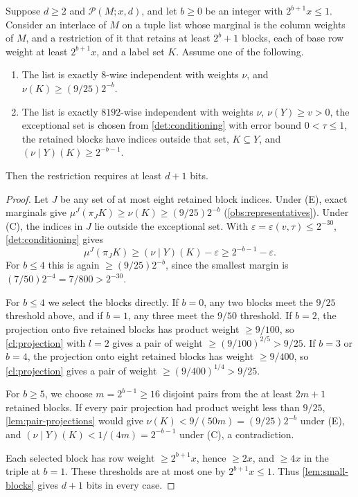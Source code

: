 \documentclass[11pt,letterpaper]{article} \usepackage[utf8]{inputenc}
\theoremstyle{plain} \newtheorem{theorem}{Theorem}[section]
\theoremstyle{definition} \newaliascnt{definition}{theorem}
\newcommand{\RP}[3]{\mathcal{P}(#1;#2,#3)}
\begin{document}
\begin{lemma}\label{det:suffix}
Suppose $d\ge2$ and $\RP{M}{x}{d}$, and let $b\ge0$ be an integer with
$2^{b+1}x\le1$. Consider an interlace of $M$ on a tuple list whose marginal is
the column weights of $M$, and a restriction of it that retains at least $2^b+1$ blocks, each
of base row weight at least $2^{b+1}x$, and a label set $K$. Assume one of the
following.
\begin{enumerate}
\item[(E)] The list is exactly $8$-wise independent with weights $\nu$, and
$\nu(K)\ge(9/25)2^{-b}$.
\item[(C)] The list is exactly $8192$-wise independent with weights $\nu$,
$\nu(Y)\ge v>0$, the exceptional set is chosen from \cref{det:conditioning}
with error bound $0<\tau\le1$, the retained blocks have indices outside that set,
$K\subseteq Y$, and $(\nu\mid Y)(K)\ge2^{-b-1}$.
\end{enumerate}
Then the restriction requires at least $d+1$ bits.
\end{lemma}
\begin{proof}
Let $J$ be any set of at most eight retained block indices. Under (E), exact
marginals give $\mu^J(\pi_JK)\ge\nu(K)\ge(9/25)2^{-b}$
(\cref{obs:representatives}). Under (C), the indices in $J$ lie outside the
exceptional set. With
$\varepsilon=\varepsilon(v,\tau)\le2^{-30}$, \cref{det:conditioning} gives
\[
\mu^J(\pi_JK)\ge(\nu\mid Y)(K)-\varepsilon
\ge2^{-b-1}-\varepsilon.
\]
For $b\le4$ this is again $\ge(9/25)2^{-b}$, since the smallest margin
is $(7/50)2^{-4}=7/800>2^{-30}$.

For $b\le4$ we select the blocks directly. If $b=0$, any two blocks meet the
$9/25$ threshold above, and if $b=1$, any three meet the $9/50$ threshold. If $b=2$, the projection onto five retained blocks has
product weight $\ge9/100$, so \cref{cl:projection} with $l=2$ gives a pair of weight
$\ge(9/100)^{2/5}>9/25$. If $b=3$ or $b=4$, the projection onto eight retained
blocks has weight $\ge9/400$, so \cref{cl:projection} gives a pair of weight
$\ge(9/400)^{1/4}>9/25$.

For $b\ge5$, we choose $m=2^{b-1}\ge16$ disjoint pairs from the at least $2m+1$
retained blocks. If every pair projection had product weight less than
$9/25$, \cref{lem:pair-projections} would give $\nu(K)<9/(50m)=(9/25)2^{-b}$
under (E), and $(\nu\mid Y)(K)<1/(4m)=2^{-b-1}$ under (C), a contradiction.

Each selected block has row weight $\ge2^{b+1}x$, hence $\ge2x$,
and $\ge4x$ in the triple at $b=1$. These thresholds are at most one by
$2^{b+1}x\le1$. Thus \cref{lem:small-blocks} gives $d+1$ bits in every case.
\end{proof}
\end{document}
